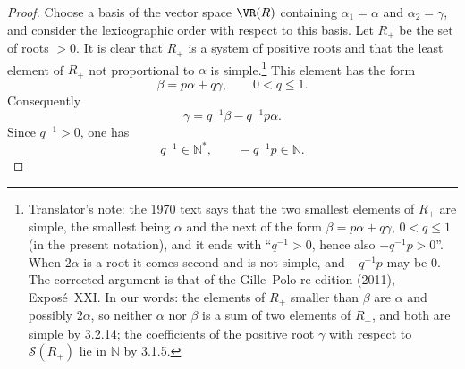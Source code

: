 \begin{proof}
Choose a basis of the vector space \(\VR(R)\) containing
\(\alpha_1=\alpha\) and \(\alpha_2=\gamma\), and consider the
lexicographic order with respect to this basis. Let \(R_+\) be the set
of roots \(>0\). It is clear that \(R_+\) is a system of positive
roots and that the
least element of \(R_+\) not proportional to \(\alpha\) is simple.\footnote{Translator's
note: the 1970 text says that the two smallest elements of \(R_+\) are simple, the
smallest being \(\alpha\) and the next of the form \(\beta=p\alpha+q\gamma\),
\(0<q\leq1\) (in the present notation), and it ends with ``\(q^{-1}>0\), hence also
\(-q^{-1}p>0\)''. When \(2\alpha\) is a root it comes second and is not simple, and
\(-q^{-1}p\) may be \(0\). The corrected argument is that of the Gille--Polo
re-edition (2011), Exposé~XXI. In our words: the elements of \(R_+\) smaller than
\(\beta\) are \(\alpha\) and possibly \(2\alpha\), so neither \(\alpha\) nor \(\beta\) is a
sum of two elements of \(R_+\), and both are simple by 3.2.14; the coefficients of the
positive root \(\gamma\) with respect to \(\mathscr{S}(R_+)\) lie in \(\mathbb N\) by
3.1.5.}
This element has the form
\[
 \beta=p\alpha+q\gamma,
 \qquad 0<q\le1.
\]
Consequently
\[
 \gamma=q^{-1}\beta-q^{-1}p\alpha.
\]
Since \(q^{-1}>0\), one has
\[
 q^{-1}\in\mathbb{N}^{\ast},
 \qquad
 -q^{-1}p\in\mathbb{N}.
\]
\end{proof}

